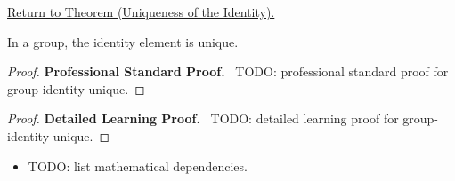 \newpage
{}
\label{prf:group-identity-unique}

\begin{remark*}[Return]
\hyperref[prop:group-identity-unique]{Return to Theorem (Uniqueness of the Identity).}
\end{remark*}

\begin{theorem*}
In a group, the identity element is unique.
\end{theorem*}

\begin{proof}
\textbf{Professional Standard Proof.}~
TODO: professional standard proof for group-identity-unique.
\end{proof}

\begin{proof}
\textbf{Detailed Learning Proof.}~
TODO: detailed learning proof for group-identity-unique.
\end{proof}

\begin{remark*}
\end{remark*}

\begin{dependencies}
\begin{itemize}
  \item TODO: list mathematical dependencies.
\end{itemize}
\end{dependencies}

\clearpage
